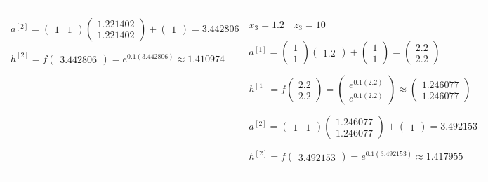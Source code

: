 \documentclass[11pt,a4paper]{article}
\begin{document}
\begin{flushleft}
\begin{tabularx}{1.09\textwidth}{X X}
    $ a^{[2]} = \begin{pmatrix} 1 & 1 \end{pmatrix} \begin{pmatrix} 1.221402 \\ 1.221402 \end{pmatrix} + \begin{pmatrix} 1 \end{pmatrix} = 3.442806 $ \par \vspace{1mm}
    $ h^{[2]} = f \begin{pmatrix} 3.442806 \end{pmatrix} = e^{0.1(3.442806)} \approx 1.410974 $ \par \vspace{1mm}
     & %
    $ \boxed{x_3 = 1.2} \quad z_3 = 10 $ \par \vspace{1mm}
    $ a^{[1]} = \begin{pmatrix} 1 \\ 1 \end{pmatrix} \begin{pmatrix} 1.2 \end{pmatrix} + \begin{pmatrix} 1 \\ 1 \end{pmatrix} = \begin{pmatrix} 2.2 \\ 2.2 \end{pmatrix} $ \par \vspace{1mm}
    $ h^{[1]} = f \begin{pmatrix} 2.2 \\ 2.2 \end{pmatrix} = \begin{pmatrix} e^{0.1(2.2)} \\ e^{0.1(2.2)} \end{pmatrix} \approx \begin{pmatrix} 1.246077 \\ 1.246077 \end{pmatrix} $ \par \vspace{1mm}
    $ a^{[2]} = \begin{pmatrix} 1 & 1 \end{pmatrix} \begin{pmatrix} 1.246077 \\ 1.246077 \end{pmatrix} + \begin{pmatrix} 1 \end{pmatrix} = 3.492153 $ \par \vspace{1mm}
    $ h^{[2]} = f \begin{pmatrix} 3.492153 \end{pmatrix} = e^{0.1(3.492153)} \approx 1.417955 $ \par \vspace{1mm}
  \end{tabularx}


\end{flushleft}
\end{document}
